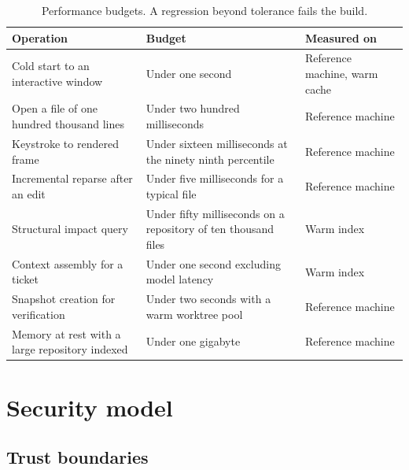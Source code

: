 \begin{table}[h]
\centering
\small
\begin{tabularx}{\textwidth}{X l l}
\toprule
\textbf{Operation} & \textbf{Budget} & \textbf{Measured on} \\
\midrule
Cold start to an interactive window & Under one second & Reference machine, warm cache \\
Open a file of one hundred thousand lines & Under two hundred milliseconds & Reference machine \\
Keystroke to rendered frame & Under sixteen milliseconds at the ninety ninth percentile & Reference machine \\
Incremental reparse after an edit & Under five milliseconds for a typical file & Reference machine \\
Structural impact query & Under fifty milliseconds on a repository of ten thousand files & Warm index \\
Context assembly for a ticket & Under one second excluding model latency & Warm index \\
Snapshot creation for verification & Under two seconds with a warm worktree pool & Reference machine \\
Memory at rest with a large repository indexed & Under one gigabyte & Reference machine \\
\bottomrule
\end{tabularx}
\caption{Performance budgets. A regression beyond tolerance fails the build.}
\end{table}

\section{Security model}

\subsection{Trust boundaries}

